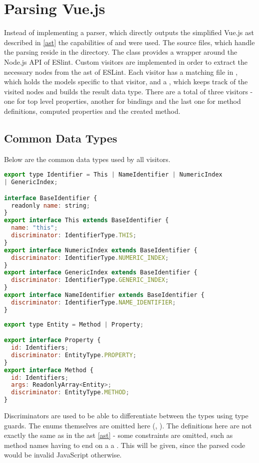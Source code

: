 \section{Parsing Vue.js}

Instead of implementing a parser, which directly outputs the simplified Vue.js \gls{ast} described in \ref{ast} the capabilities of \textcite{eslintMainPage} 
and \parencite{eslint_vue_parser} were used. 
The source files, which handle the parsing reside in the  directory.
The  class provides a wrapper around the Node.js API of ESlint. Custom visitors are implemented in order to extract the necessary nodes from the \gls{ast} of ESLint. Each visitor has a matching file in , which holds the models specific to that visitor, and a , which keeps track of the visited nodes and builds the result data type. There are a total of three visitors - one for top level properties, another for bindings and the last one for method definitions, computed properties and the created method.
 
\subsection{Common Data Types}
Below are the common data types used by all visitors.
\begin{lstlisting}[language=JavaScript]
export type Identifier = This | NameIdentifier | NumericIndex 
| GenericIndex;

interface BaseIdentifier {
  readonly name: string;
}
export interface This extends BaseIdentifier {
  name: "this";
  discriminator: IdentifierType.THIS;
}
export interface NumericIndex extends BaseIdentifier {
  discriminator: IdentifierType.NUMERIC_INDEX;
}
export interface GenericIndex extends BaseIdentifier {
  discriminator: IdentifierType.GENERIC_INDEX;
}
export interface NameIdentifier extends BaseIdentifier {
  discriminator: IdentifierType.NAME_IDENTIFIER;
}
\end{lstlisting}

\begin{lstlisting}[language=JavaScript]
export type Entity = Method | Property;

export interface Property {
  id: Identifiers;
  discriminator: EntityType.PROPERTY;
}
export interface Method {
  id: Identifiers;
  args: ReadonlyArray<Entity>;
  discriminator: EntityType.METHOD;
}
\end{lstlisting}
Discriminators are used to be able to differentiate between the types using type guards. The enums themselves are omitted here (, ). The definitions here are not exactly the same as in the \gls{ast} \ref{ast} - some constraints are omitted, such as method names having to end on a a . This will be given, since the parsed code would be invalid JavaScript otherwise.
